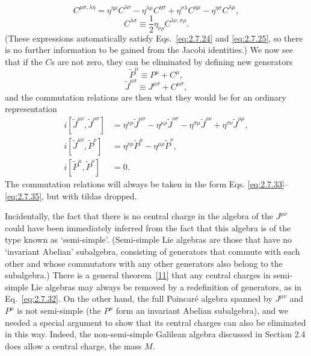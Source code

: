 \begin{equation}
  C^{\mu\sigma,\lambda\eta}
    =\eta^{\eta\mu}C^{\lambda\sigma}
      -\eta^{\lambda\mu}C^{\eta\sigma}
      +\eta^{\sigma\lambda}C^{\eta\mu}
      -\eta^{\eta\sigma}C^{\lambda\mu},
  \tag{2.7.29}\label{eq:2.7.29}
\end{equation}
\begin{equation}
  C^{\lambda\sigma}\equiv
    \frac{1}{2}\eta_{\nu\rho}C^{\lambda\nu,\sigma\rho}.
  \tag{2.7.30}\label{eq:2.7.30}
\end{equation}
(These expressions automatically satisfy Eqs.~\eqref{eq:2.7.24} and \eqref{eq:2.7.25}, so there
is no further information to be gained from the Jacobi identities.) We now see
that if the $C$s are not zero, they can be eliminated by defining new
generators
\begin{equation}
  \widetilde P^\mu\equiv P^\mu+C^\mu,
  \tag{2.7.31}\label{eq:2.7.31}
\end{equation}
\begin{equation}
  \widetilde J^{\mu\sigma}\equiv J^{\mu\sigma}+C^{\mu\sigma},
  \tag{2.7.32}\label{eq:2.7.32}
\end{equation}
and the commutation relations are then what they would be for an ordinary
representation
\begin{align}
  i[\widetilde J^{\mu\nu},\widetilde J^{\rho\sigma}]
  &={}
    \eta^{\nu\rho}\widetilde J^{\mu\sigma}
    -\eta^{\mu\rho}\widetilde J^{\nu\sigma}
    -\eta^{\sigma\mu}\widetilde J^{\rho\nu}
    +\eta^{\sigma\nu}\widetilde J^{\rho\mu},
  \tag{2.7.33}\label{eq:2.7.33}\\
  i[\widetilde J^{\mu\nu},\widetilde P^\rho]
  &={}
    \eta^{\nu\rho}\widetilde P^\mu
    -\eta^{\mu\rho}\widetilde P^\nu,
  \tag{2.7.34}\label{eq:2.7.34}\\
  i[\widetilde P^\mu,\widetilde P^\rho]&=0.
  \tag{2.7.35}\label{eq:2.7.35}
\end{align}
The commutation relations will always be taken in the form Eqs.
\eqref{eq:2.7.33}--\eqref{eq:2.7.35}, but with tildas dropped.

Incidentally, the fact that there is no central charge in the algebra of the
$J^{\mu\nu}$ could have been immediately inferred from the fact that this
algebra is of the type known as `semi-simple'. (Semi-simple Lie algebras are
those that have no `invariant Abelian' subalgebra, consisting of generators that
commute with each other and whose commutators with any other generators also
belong to the subalgebra.) There is a general theorem~\hyperref[ref:2.11]{[11]} that
any central charges in semi-simple Lie algebras may always be removed by a
redefinition of generators, as in Eq.~\eqref{eq:2.7.32}. On the other hand, the full
Poincar\'e algebra spanned by $J^{\mu\nu}$ and $P^\mu$ is not semi-simple (the
$P^\mu$ form an invariant Abelian subalgebra), and we needed a special argument
to show that its central charges can also be eliminated in this way. Indeed,
the non-semi-simple Galilean algebra discussed in Section 2.4 does allow a
central charge, the mass $M$.

